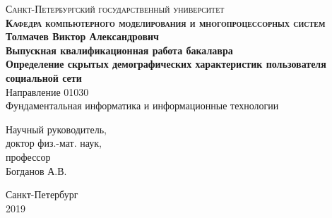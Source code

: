 \thispagestyle{empty}

\begin{center}

\textsc{Санкт-Петербургский государственный университет \\
\textbf{Кафедра компьютерного моделирования и многопроцессорных систем}} \\ 
\vspace{3cm} 
\Large{\textbf{Толмачев Виктор Александрович}} \\
\vspace{1.5cm}
\large{\textbf{Выпускная квалификационная работа бакалавра}} \\ 
\vspace{2.5cm}
\Large{\textbf{Определение скрытых демографических характеристик пользователя социальной сети}} \\ 
\normalsize{Направление 01030 \\
Фундаментальная информатика и информационные технологии} \\
\end{center}
\vspace{2.5cm}
\hspace{9cm} Научный руководитель, \\
\hspace*{9cm} доктор физ.-мат. наук, \\
\hspace*{9cm} профессор \\ 
\hspace*{9cm} Богданов А.В. 
\begin{center}
\vfill
Санкт-Петербург \\
2019
\end{center}

\clearpage